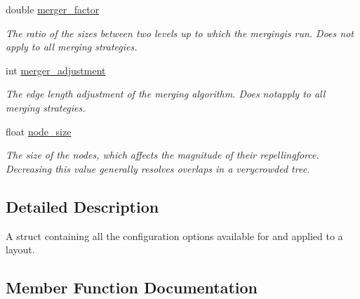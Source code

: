 \begin{DoxyCompactItemize}
\mbox{\label{structLayoutConfiguration_a98f6187e2dc15b0f06bcbfef5562beae}} 
double \hyperlink{structLayoutConfiguration_a98f6187e2dc15b0f06bcbfef5562beae}{merger\+\_\+factor}
\begin{DoxyCompactList}\small\item\em The ratio of the sizes between two levels up to which the mergingis run. Does not apply to all merging strategies. \end{DoxyCompactList}\item 
\mbox{\label{structLayoutConfiguration_a382a084c8d4785151b9328221c4ba132}} 
int \hyperlink{structLayoutConfiguration_a382a084c8d4785151b9328221c4ba132}{merger\+\_\+adjustment}
\begin{DoxyCompactList}\small\item\em The edge length adjustment of the merging algorithm. Does notapply to all merging strategies. \end{DoxyCompactList}\item 
\mbox{\label{structLayoutConfiguration_a54a32d5173963abca63aae5bfa9d68e1}} 
float \hyperlink{structLayoutConfiguration_a54a32d5173963abca63aae5bfa9d68e1}{node\+\_\+size}
\begin{DoxyCompactList}\small\item\em The size of the nodes, which affects the magnitude of their repellingforce. Decreasing this value generally resolves overlaps in a verycrowded tree. \end{DoxyCompactList}\end{DoxyCompactItemize}


\subsection{Detailed Description}
A struct containing all the configuration options available for and applied to a layout. 

\subsection{Member Function Documentation}
\mbox{\label{structLayoutConfiguration_a8be8ea09a3143cf9ba54a5069f0934d1}} 
